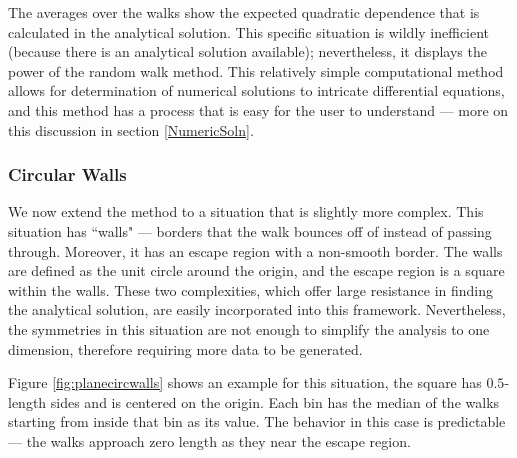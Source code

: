\documentclass[12pt]{article}
\begin{document}
			The averages over the walks show the expected quadratic dependence that is calculated in the analytical solution.
			This specific situation is wildly inefficient (because there is an analytical solution available); nevertheless, it displays the power of the random walk method.
			This relatively simple computational method allows for determination of numerical solutions to intricate differential equations, and this method has a process that is easy for the user to understand --- more on this discussion in section \ref{NumericSoln}.
			
		\subsubsection{Circular Walls}
			We now extend the method to a situation that is slightly more complex.
			This situation has ``walls" --- borders that the walk bounces off of instead of passing through.
			Moreover, it has an escape region with a non-smooth border.
			The walls are defined as the unit circle around the origin, and the escape region is a square within the walls.
			These two complexities, which offer large resistance in finding the analytical solution, are easily incorporated into this framework.
			Nevertheless, the symmetries in this situation are not enough to simplify the analysis to one dimension, therefore requiring more data to be generated.
			
			Figure \ref{fig:planecircwalls} shows an example for this situation, the square has $0.5$-length sides and is centered on the origin.
			Each bin has the median of the walks starting from inside that bin as its value.
			The behavior in this case is predictable --- the walks approach zero length as they near the escape region.
			
\end{document}
